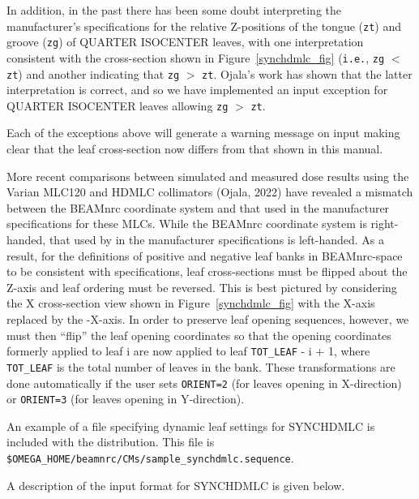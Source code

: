 \documentclass[12pt,twoside]{article}
\begin{document}
In addition, in the past there has been some doubt interpreting the manufacturer's specifications for the relative Z-positions
of the tongue ({\tt zt}) and groove ({\tt zg}) of QUARTER ISOCENTER leaves, with one interpretation consistent with the
cross-section shown in Figure~\ref{synchdmlc_fig} ({\tt i.e.}, {\tt zg} $<$ {\tt zt}) and another indicating
that {\tt zg} $>$ {\tt zt}.  Ojala's work has shown that the latter interpretation is correct, and so we have implemented
an input exception for QUARTER ISOCENTER leaves allowing {\tt zg} $>$ {\tt zt}.

Each of the exceptions above will generate a warning message on input making clear that the leaf cross-section now differs
from that shown in this manual.

More recent comparisons between simulated and measured dose results using the Varian
MLC120 and HDMLC collimators (Ojala, 2022) have revealed a mismatch between the BEAMnrc coordinate system and
that used in the manufacturer specifications for these MLCs.  While the BEAMnrc coordinate system is right-handed, that used by in the manufacturer specifications is left-handed.  As a result, for the definitions of positive
and negative leaf banks in BEAMnrc-space to
be consistent with specifications, leaf cross-sections must be flipped about the Z-axis and leaf ordering
must be reversed.  This is best pictured by considering the X cross-section view shown in Figure~\ref{synchdmlc_fig}
with the X-axis replaced by the -X-axis.  In order to preserve leaf opening sequences, however,
we must then ``flip'' the
leaf opening coordinates so that the opening coordinates formerly applied to leaf i are now applied to leaf
{\tt TOT\_LEAF} - i + 1, where {\tt TOT\_LEAF} is the total number of leaves in the bank.
These transformations are done automatically if
the user sets {\tt ORIENT=2} (for leaves opening in X-direction) or {\tt ORIENT=3} (for leaves opening in Y-direction).

An example of a file specifying dynamic leaf settings for SYNCHDMLC
is included with the distribution.  This file is {\tt \$OMEGA\_HOME/beamnrc/CMs/sample\_synchdmlc.sequence}.

A description of the input format for SYNCHDMLC is given below.

\begin{small}

\end{small}
\end{document}
